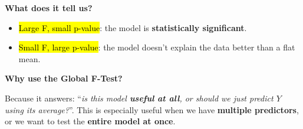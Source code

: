 \highspace
\begin{flushleft}
    \textcolor{Green3}{ \textbf{What does it tell us?}}
\end{flushleft}
\begin{itemize}
    \item \hl{Large F, small p-value}: the model is \textbf{statistically significant}.
    \item \hl{Small F, large p-value}: the model doesn't explain the data better than a flat mean.
\end{itemize}

\highspace
\begin{flushleft}
    \textcolor{Red2}{ \textbf{Why use the Global F-Test?}}
\end{flushleft}
Because it answers: ``\emph{is this model \textbf{useful at all}, or should we just predict $Y$ using its average?}''. This is especially useful when we have \textbf{multiple predictors}, or we want to test the \textbf{entire model at once}.

